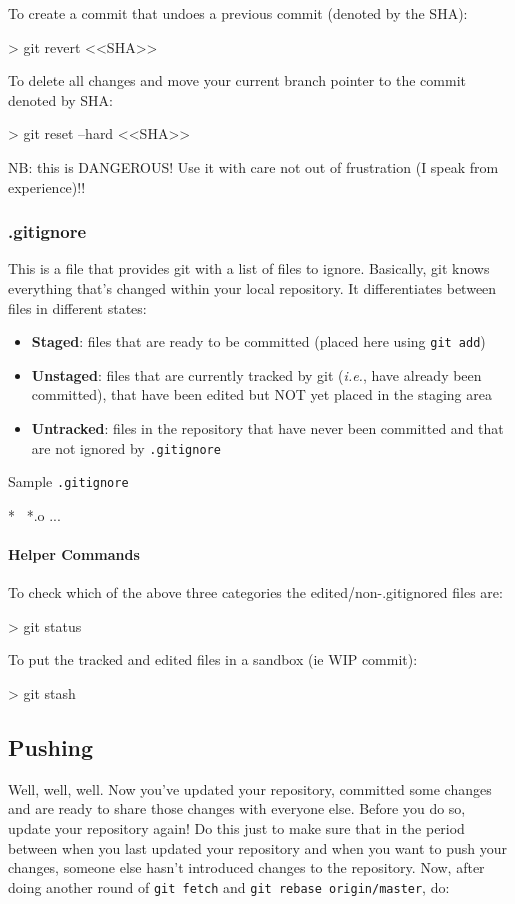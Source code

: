 \documentclass[10pt,letterpaper]{article}
\begin{document}
To create a commit that undoes a previous commit (denoted by the SHA):
\begin{code}
> git revert <<SHA>>
\end{code}

\noindent To delete all changes and move your current branch pointer to the commit denoted by SHA:
\begin{code}
> git reset --hard <<SHA>>
\end{code}
\noindent NB: this is DANGEROUS! Use it with care not out of frustration (I speak from experience)!!

\subsubsection{.gitignore}

This is a file that provides git with a list of files to ignore. Basically, git knows everything that's changed within your local repository. It differentiates between files in different states:
\begin{itemize}
\item \textbf{Staged}: files that are ready to be committed (placed here using \texttt{git add})
\item \textbf{Unstaged}: files that are currently tracked by git (\textit{i.e.}, have already been committed), that have been edited but NOT yet placed in the staging area
\item \textbf{Untracked}: files in the repository that have never been committed and that are not ignored by \texttt{.gitignore}
\end{itemize}
\noindent Sample \texttt{.gitignore}
\begin{code}
*~
*.o
...
\end{code}

\paragraph{Helper Commands}

\noindent To check which of the above three categories the edited/non-.gitignored files are:
\begin{code}
> git status
\end{code}

\noindent To put the tracked and edited files in a sandbox (ie WIP commit):
\begin{code}
> git stash
\end{code}

\subsection{Pushing}
Well, well, well. Now you've updated your repository, committed some changes and are ready to share those changes with everyone else. Before you do so, update your repository again! Do this just to make sure that in the period between when you last updated your repository and when you want to push your changes, someone else hasn't introduced changes to the repository. Now, after doing another round of \texttt{git fetch} and \texttt{git rebase origin/master}, do:
\end{document}
